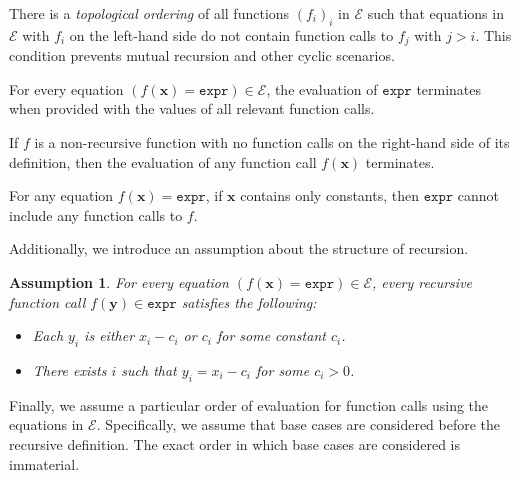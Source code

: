 \documentclass[a4paper,UKenglish,cleveref, autoref, thm-restate]{lipics-v2021}
\newcommand{\expr}{\mathtt{expr}}
\newtheorem{assumption}[theorem]{Assumption}
\begin{document}
\begin{observation}\label{assumption2}
  There is a \emph{topological ordering} of all functions ${(f_{i})}_{i}$ in
  $\mathcal{E}$ such that equations in $\mathcal{E}$ with $f_{i}$ on the
  left-hand side do not contain function calls to $f_{j}$ with $j > i$. This
  condition prevents mutual recursion and other cyclic scenarios.
\end{observation}

\begin{observation}\label{assumption3}
  For every equation $(f(\mathbf{x}) = \expr) \in \mathcal{E}$, the evaluation
  of $\expr$ terminates when provided with the values of all relevant function
  calls.
\end{observation}

\begin{corollary}\label{fact}
  If $f$ is a non-recursive function with no function calls on the right-hand
  side of its definition, then the evaluation of any function call
  $f(\mathbf{x})$ terminates.
\end{corollary}

\begin{observation}\label{fact2}
  For any equation $f(\mathbf{x}) = \expr{}$, if $\mathbf{x}$ contains only
  constants, then $\expr{}$ cannot include any function calls to $f$.
\end{observation}

Additionally, we introduce an assumption about the structure of recursion.

\begin{assumption}\label{assumption4}
  For every equation $(f(\mathbf{x}) = \expr) \in \mathcal{E}$, every recursive
  function call $f(\mathbf{y}) \in \expr$ satisfies the
  following:
  \begin{itemize}
    \item Each $y_{i}$ is either $x_{i} - c_{i}$ or $c_{i}$ for some constant
          $c_{i}$.
    \item There exists $i$ such that $y_{i} = x_{i} - c_{i}$ for some
          $c_{i} > 0$.
  \end{itemize}
\end{assumption}

Finally, we assume a particular order of evaluation for function calls using the
equations in $\mathcal{E}$. Specifically, we assume that base cases are
considered before the recursive definition. The exact order in which base cases
are considered is immaterial.
\end{document}
